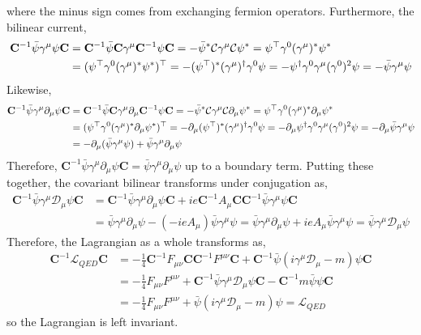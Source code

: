 \documentclass[12pt]{article}
\newcommand{\lagrange}{\mathcal{L}}
\newcommand{\conj}{\mathbf{C}}
\begin{document}
where the minus sign comes from exchanging fermion operators. 
Furthermore, the bilinear current,
\begin{align*}
\conj^{-1} \bar{\psi} \gamma^\mu \psi \conj & = \conj^{-1} \bar{\psi} \conj \gamma^\mu \conj^{-1} \psi \conj = - \bar{\psi}^* \cmat \gamma^\mu \cmat \psi^* = \psi^\top \gamma^0 (\gamma^\mu)^* \psi^*
\\
& = (\psi^\top \gamma^0 (\gamma^\mu)^* \psi^*)^\top = -(\psi^\top)^* (\gamma^\mu)^\dagger \gamma^0 \psi = -\psi^\dagger \gamma^0 \gamma^\mu (\gamma^0)^2 \psi = -\bar{\psi} \gamma^\mu \psi
\end{align*}
Likewise,
\begin{align*}
\conj^{-1} \bar{\psi} \gamma^\mu \partial_\mu \psi \conj & = \conj^{-1} \bar{\psi} \conj \gamma^\mu \partial_\mu \conj^{-1} \psi \conj = - \bar{\psi}^* \cmat \gamma^\mu \cmat \partial_\mu \psi^* = \psi^\top \gamma^0 (\gamma^\mu)^* \partial_\mu \psi^*
\\
& = (\psi^\top \gamma^0 (\gamma^\mu)^* \partial_\mu \psi^*)^\top = -\partial_\mu (\psi^\top)^* (\gamma^\mu)^\dagger \gamma^0 \psi = - \partial_\mu \psi^\dagger \gamma^0 \gamma^\mu (\gamma^0)^2 \psi = -\partial_\mu \bar{\psi} \gamma^\mu \psi
\\
& = -\partial_\mu (\bar{\psi} \gamma^\mu \psi) + \bar{\psi} \gamma^\mu \partial_\mu \psi
\end{align*} 
Therefore, $\conj^{-1} \bar{\psi} \gamma^\mu \partial_\mu \psi \conj = \bar{\psi} \gamma^\mu \partial_\mu \psi$ up to a boundary term.
Putting these together, the covariant bilinear transforms under conjugation as,
\begin{align*}
\conj^{-1} \bar{\psi} \gamma^\mu \mathcal{D}_\mu \psi \conj & = \conj^{-1} \bar{\psi} \gamma^\mu \partial_\mu \psi \conj + ie \conj^{-1} A_\mu \conj \conj^{-1} \bar{\psi} \gamma^\mu \psi \conj
\\
& = \bar{\psi} \gamma^\mu \partial_\mu \psi - (-i e A_\mu) \bar{\psi} \gamma^\mu \psi = \bar{\psi} \gamma^\mu \partial_\mu \psi +  i e A_\mu \bar{\psi} \gamma^\mu \psi = \bar{\psi} \gamma^\mu \mathcal{D}_\mu \psi
\end{align*}
Therefore, the Lagrangian as a whole transforms as,
\begin{align*}
\conj^{-1} \lagrange_{QED} \conj & = - \tfrac{1}{4} \conj^{-1} F_{\mu \nu} \conj \conj^{-1} F^{\mu \nu} \conj + \conj^{-1} \bar{\psi} (i \gamma^\mu \mathcal{D}_\mu - m)  \psi \conj 
\\
& =  - \tfrac{1}{4} F_{\mu \nu} F^{\mu \nu} + \conj^{-1} \bar{\psi} \gamma^\mu \mathcal{D}_\mu \psi \conj - \conj^{-1} m \bar{\psi} \psi \conj
\\
& =  - \tfrac{1}{4} F_{\mu \nu} F^{\mu \nu} + \bar{\psi} (i \gamma^\mu \mathcal{D}_\mu - m)  \psi = \lagrange_{QED}
\end{align*}
so the Lagrangian is left invariant. 
\end{document}
